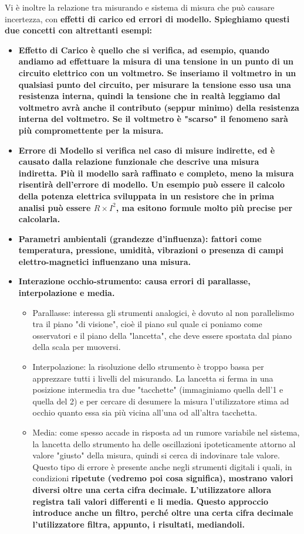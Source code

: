 \documentclass[a4paper,11pt]{report}
\begin{document}
Vi è inoltre la relazione tra misurando e sistema di misura che può causare incertezza, con \bf effetti di carico \rm ed \bf errori di modello\rm. Spieghiamo questi due concetti con altrettanti esempi:

\begin{itemize}
  \item \bf Effetto di Carico \rm è quello che si verifica, ad esempio, quando andiamo ad effettuare la misura di una tensione in un punto di un circuito elettrico con un voltmetro. Se inseriamo il voltmetro in un qualsiasi punto del circuito, per misurare la tensione esso usa una resistenza interna, quindi la tensione che in realtà leggiamo dal voltmetro avrà anche il contributo (seppur minimo) della resistenza interna del voltmetro. Se il voltmetro è "scarso" il fenomeno sarà più compromettente per la misura.
  \item \bf Errore di Modello \rm si verifica nel caso di misure indirette, ed è causato dalla relazione funzionale che descrive una misura indiretta. Più il modello sarà raffinato e completo, meno la misura risentirà dell'errore di modello. Un esempio può essere il calcolo della potenza elettrica sviluppata in un resistore che in prima analisi può essere $R \times I^2 $, ma esitono formule molto più precise per calcolarla.
  \item \bf Parametri ambientali (grandezze d'influenza)\rm: fattori come temperatura, pressione, umidità, vibrazioni o presenza di campi elettro-magnetici influenzano una misura.
  \item \bf Interazione occhio-strumento\rm: causa errori di parallasse, interpolazione e media.
  \begin{itemize}
    \item Parallasse: interessa gli strumenti analogici, è dovuto al non parallelismo tra il piano "di visione", cioè il piano sul quale ci poniamo come osservatori e il piano della "lancetta", che deve essere spostata dal piano della scala per muoversi.
    \item Interpolazione: la risoluzione dello strumento è troppo bassa per apprezzare tutti i livelli del misurando. La lancetta si ferma in una posizione intermedia tra due "tacchette" (immaginiamo quella dell'1 e quella del 2) e per cercare di desumere la misura l'utilizzatore stima ad occhio quanto essa sia più vicina all'una od all'altra tacchetta.
    \item Media: come spesso accade in risposta ad un rumore variabile nel sistema, la lancetta dello strumento ha delle oscillazioni ipoteticamente attorno al valore "giusto" della misura, quindi si cerca di indovinare tale valore. Questo tipo di errore è presente anche negli strumenti digitali i quali, in condizioni \bf ripetute \rm (vedremo poi cosa significa), mostrano valori diversi oltre una certa cifra decimale. L'utilizzatore allora registra tali valori differenti e li media. Questo approccio introduce anche un \bf filtro\rm, perché oltre una certa cifra decimale l'utilizzatore filtra, appunto, i risultati, mediandoli.

\end{itemize}
\end{itemize}
\end{document}
